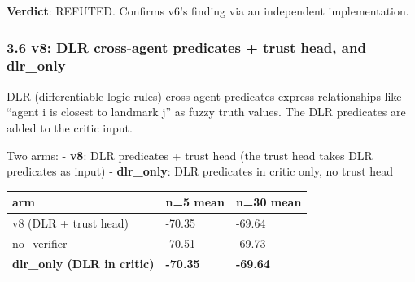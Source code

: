 \documentclass[
]{article}
\newcounter{none} %
\begin{document}
\textbf{Verdict}: REFUTED. Confirms v6's finding via an independent
implementation.

\subsubsection{3.6 v8: DLR cross-agent predicates + trust head, and
dlr\_only}\label{v8-dlr-cross-agent-predicates-trust-head-and-dlr_only}

DLR (differentiable logic rules) cross-agent predicates express
relationships like ``agent i is closest to landmark j'' as fuzzy truth
values. The DLR predicates are added to the critic input.

Two arms: - \textbf{v8}: DLR predicates + trust head (the trust head
takes DLR predicates as input) - \textbf{dlr\_only}: DLR predicates in
critic only, no trust head

{\def\LTcaptype{none} %
\begin{longtable}[]{@{}lll@{}}
\toprule\noalign{}
arm & n=5 mean & n=30 mean \\
\midrule\noalign{}
\endhead
\bottomrule\noalign{}
\endlastfoot
v8 (DLR + trust head) & -70.35 & -69.64 \\
no\_verifier & -70.51 & -69.73 \\
\textbf{dlr\_only (DLR in critic)} & \textbf{-70.35} &
\textbf{-69.64} \\
\end{longtable}
}
\end{document}
